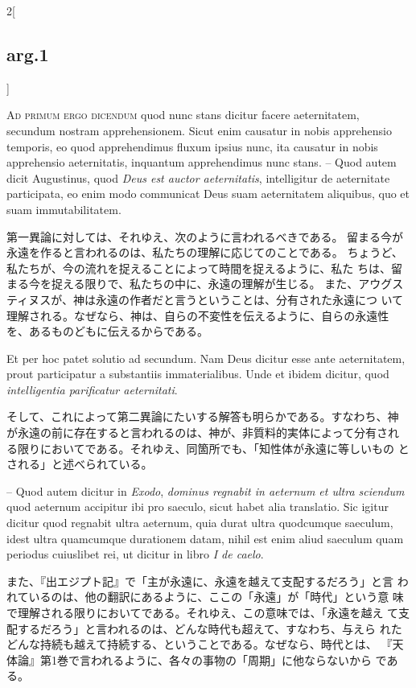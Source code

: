 \documentclass[paper=a4paper,fontsize=10pt,jafontsize=9pt,titlepage]{jlreq}
\begin{document}
\begin{paracol}{2}[\subsection{arg.1}]
\switchcolumn*[\subsection{ad.1}]

{\scshape Ad primum ergo dicendum} quod nunc stans dicitur facere
aeternitatem, secundum nostram apprehensionem. Sicut enim causatur in
nobis apprehensio temporis, eo quod apprehendimus fluxum ipsius nunc,
ita causatur in nobis apprehensio aeternitatis, inquantum apprehendimus
nunc stans. -- Quod autem dicit Augustinus, quod {\itshape Deus est auctor
aeternitatis}, intelligitur de aeternitate participata, eo enim modo
communicat Deus suam aeternitatem aliquibus, quo et suam
immutabilitatem.

\switchcolumn

第一異論に対しては、それゆえ、次のように言われるべきである。
留まる今が永遠を作ると言われるのは、私たちの理解に応じてのことである。
ちょうど、私たちが、今の流れを捉えることによって時間を捉えるように、私た
ちは、留まる今を捉える限りで、私たちの中に、永遠の理解が生じる。
また、アウグスティヌスが、神は永遠の作者だと言うということは、分有された永遠につ
いて理解される。なぜなら、神は、自らの不変性を伝えるように、自らの永遠性
を、あるものどもに伝えるからである。

\switchcolumn*

Et per hoc patet solutio ad secundum. Nam Deus dicitur esse ante
aeternitatem, prout participatur a substantiis immaterialibus. Unde et
ibidem dicitur, quod {\itshape intelligentia parificatur aeternitati}.

\switchcolumn

そして、これによって第二異論にたいする解答も明らかである。すなわち、神
が永遠の前に存在すると言われるのは、神が、非質料的実体によって分有され
る限りにおいてである。それゆえ、同箇所でも、「知性体が永遠に等しいもの
とされる」と述べられている。

\switchcolumn*

-- Quod autem
dicitur in {\itshape Exodo}, {\itshape dominus regnabit in aeternum et ultra
sciendum} quod aeternum accipitur ibi pro saeculo, sicut habet alia
translatio. Sic igitur dicitur quod regnabit ultra aeternum, quia durat
ultra quodcumque saeculum, idest ultra quamcumque durationem datam,
nihil est enim aliud saeculum quam periodus cuiuslibet rei, ut dicitur
in libro {\itshape I de caelo}.

\switchcolumn

また、『出エジプト記』で「主が永遠に、永遠を越えて支配するだろう」と言
われているのは、他の翻訳にあるように、ここの「永遠」が「時代」という意
味で理解される限りにおいてである。それゆえ、この意味では、「永遠を越え
て支配するだろう」と言われるのは、どんな時代も超えて、すなわち、与えら
れたどんな持続も越えて持続する、ということである。なぜなら、時代とは、
『天体論』第1巻で言われるように、各々の事物の「周期」に他ならないから
である。


\end{paracol}
\end{document}
